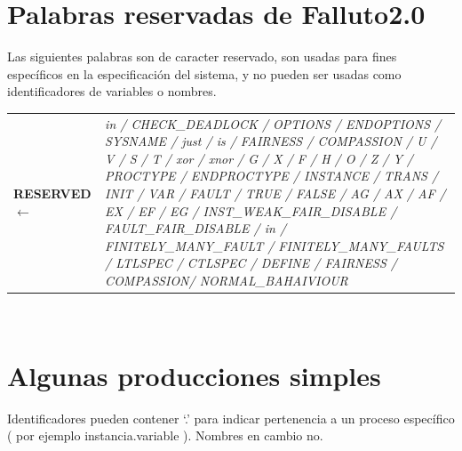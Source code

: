 \documentclass[titlepage, 12pt]{book}
\begin{document}
\section{Palabras reservadas de Falluto2.0}

Las siguientes palabras son de caracter reservado, son usadas para fines espec\'ificos en la especificaci\'on del sistema, y no pueden ser usadas como identificadores de variables o nombres.\\

\begin{tabularx}{\textwidth}{>{\bfseries}l>{\itshape}X }

RESERVED $\longleftarrow$ & in / CHECK\_DEADLOCK / OPTIONS / ENDOPTIONS / SYSNAME / just / is / FAIRNESS / COMPASSION / U / V / S / T / xor / xnor / G / X / F / H / O / Z / Y / PROCTYPE / ENDPROCTYPE / INSTANCE / TRANS / INIT / VAR / FAULT / TRUE / FALSE / AG / AX / AF / EX / EF / EG / INST\_WEAK\_FAIR\_DISABLE / FAULT\_FAIR\_DISABLE / in / FINITELY\_MANY\_FAULT / FINITELY\_MANY\_FAULTS / LTLSPEC / CTLSPEC / DEFINE / FAIRNESS / COMPASSION/ NORMAL\_BAHAIVIOUR\\
\end{tabularx}
~\\



\section{Algunas producciones simples}

Identificadores pueden contener `.' para indicar pertenencia a un proceso espec\'ifico ( por ejemplo instancia.variable ). Nombres en cambio no.\\
\end{document}
